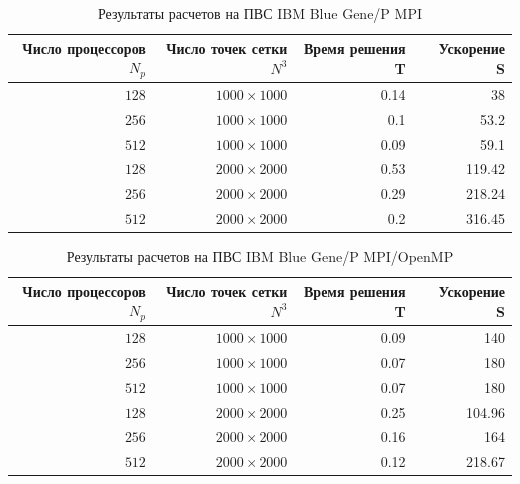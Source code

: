 \documentclass [12pt, a4paper] {article}
\begin{document}
\begin{table}[htb]
    \centering
    \caption{Результаты расчетов на ПВС IBM Blue Gene/P MPI}
    \begin{tabular}{|r|r|r|r|}
        \hline
        Число процессоров $N_p$ & Число точек сетки $N^3$ & Время решения T & \
            Ускорение S \\ \hline
        $128$ & $ 1000 \times 1000 $ & 0.14 & 38 \\ 
        $256$ & $ 1000 \times 1000 $ & 0.1 & 53.2 \\ 
        $512$ & $ 1000 \times 1000 $ & 0.09 & 59.1 \\ \hline
        $128$ & $ 2000 \times 2000 $ & 0.53 & 119.42 \\ 
        $256$ & $ 2000 \times 2000 $ & 0.29 & 218.24 \\ 
        $512$ & $ 2000 \times 2000 $ & 0.2 & 316.45 \\ \hline
    \end{tabular}
\end{table}
\begin{table}[htb]
    \centering
    \caption{Результаты расчетов на ПВС IBM Blue Gene/P MPI/OpenMP}
    \begin{tabular}{|r|r|r|r|}
        \hline
        Число процессоров $N_p$ & Число точек сетки $N^3$ & Время решения T & \
            Ускорение S \\ \hline

        $128$ & $ 1000 \times 1000 $ & 0.09 & 140 \\ 
        $256$ & $ 1000 \times 1000 $ & 0.07 & 180 \\ 
        $512$ & $ 1000 \times 1000 $ & 0.07 & 180 \\ \hline

        $128$ & $ 2000 \times 2000 $ & 0.25 & 104.96 \\ 
        $256$ & $ 2000 \times 2000 $ & 0.16 & 164 \\ 
        $512$ & $ 2000 \times 2000 $ & 0.12 & 218.67 \\ \hline
    \end{tabular}
\end{table}


\newpage
\end{document}
